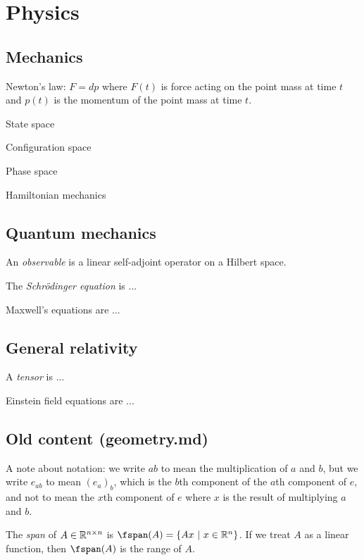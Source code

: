 \chapter{Physics}

\section{Mechanics}

Newton's law:
\(F = dp\) where \(F(t)\) is force acting on the point mass at time \(t\)
and \(p(t)\) is the momentum of the point mass at time \(t\).

State space

Configuration space

Phase space

Hamiltonian mechanics

\section{Quantum mechanics}

%
An \emph{observable} is a linear self-adjoint operator on a Hilbert space.

%
The \emph{Schr\"odinger equation} is ...

%
Maxwell's equations are ...

\section{General relativity}

%
A \emph{tensor} is ...

%
Einstein field equations are ...

\section{Old content (geometry.md)}

A note about notation: we write $ab$ to mean the multiplication of $a$ and $b$,
but we write $e_{ab}$ to mean $(e_a)_b$, which is the $b$th component of the $a$th component of $e$,
and not to mean the $x$th component of $e$ where $x$ is the result of multiplying $a$ and $b$.

The \emph{span} of \(A \in \mathbb{R}^{n\times n}\) is $\fspan(A) = \{ Ax ~|~ x \in \Real^n \}$.
If we treat \(A\) as a linear function,
then \(\fspan(A)\) is the range of \(A\).

